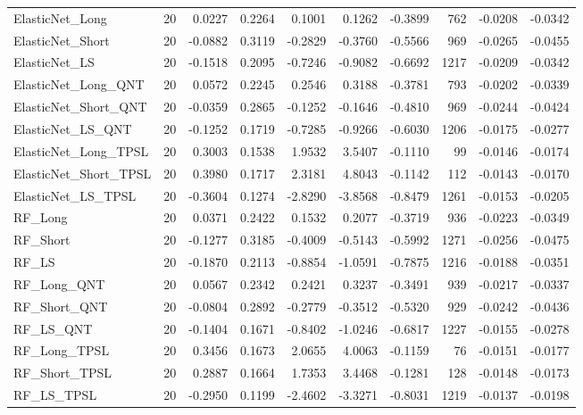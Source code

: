 \begin{tabular}{llrrrrrrrr}
\cline{1-10}
ElasticNet\_Long & 20 & 0.0227 & 0.2264 & 0.1001 & 0.1262 & -0.3899 & 762 & -0.0208 & -0.0342 \\
\cline{1-10}
ElasticNet\_Short & 20 & -0.0882 & 0.3119 & -0.2829 & -0.3760 & -0.5566 & 969 & -0.0265 & -0.0455 \\
\cline{1-10}
ElasticNet\_LS & 20 & -0.1518 & 0.2095 & -0.7246 & -0.9082 & -0.6692 & 1217 & -0.0209 & -0.0342 \\
\cline{1-10}
ElasticNet\_Long\_QNT & 20 & 0.0572 & 0.2245 & 0.2546 & 0.3188 & -0.3781 & 793 & -0.0202 & -0.0339 \\
\cline{1-10}
ElasticNet\_Short\_QNT & 20 & -0.0359 & 0.2865 & -0.1252 & -0.1646 & -0.4810 & 969 & -0.0244 & -0.0424 \\
\cline{1-10}
ElasticNet\_LS\_QNT & 20 & -0.1252 & 0.1719 & -0.7285 & -0.9266 & -0.6030 & 1206 & -0.0175 & -0.0277 \\
\cline{1-10}
ElasticNet\_Long\_TPSL & 20 & 0.3003 & 0.1538 & 1.9532 & 3.5407 & -0.1110 & 99 & -0.0146 & -0.0174 \\
\cline{1-10}
ElasticNet\_Short\_TPSL & 20 & 0.3980 & 0.1717 & 2.3181 & 4.8043 & -0.1142 & 112 & -0.0143 & -0.0170 \\
\cline{1-10}
ElasticNet\_LS\_TPSL & 20 & -0.3604 & 0.1274 & -2.8290 & -3.8568 & -0.8479 & 1261 & -0.0153 & -0.0205 \\
\cline{1-10}
RF\_Long & 20 & 0.0371 & 0.2422 & 0.1532 & 0.2077 & -0.3719 & 936 & -0.0223 & -0.0349 \\
\cline{1-10}
RF\_Short & 20 & -0.1277 & 0.3185 & -0.4009 & -0.5143 & -0.5992 & 1271 & -0.0256 & -0.0475 \\
\cline{1-10}
RF\_LS & 20 & -0.1870 & 0.2113 & -0.8854 & -1.0591 & -0.7875 & 1216 & -0.0188 & -0.0351 \\
\cline{1-10}
RF\_Long\_QNT & 20 & 0.0567 & 0.2342 & 0.2421 & 0.3237 & -0.3491 & 939 & -0.0217 & -0.0337 \\
\cline{1-10}
RF\_Short\_QNT & 20 & -0.0804 & 0.2892 & -0.2779 & -0.3512 & -0.5320 & 929 & -0.0242 & -0.0436 \\
\cline{1-10}
RF\_LS\_QNT & 20 & -0.1404 & 0.1671 & -0.8402 & -1.0246 & -0.6817 & 1227 & -0.0155 & -0.0278 \\
\cline{1-10}
RF\_Long\_TPSL & 20 & 0.3456 & 0.1673 & 2.0655 & 4.0063 & -0.1159 & 76 & -0.0151 & -0.0177 \\
\cline{1-10}
RF\_Short\_TPSL & 20 & 0.2887 & 0.1664 & 1.7353 & 3.4468 & -0.1281 & 128 & -0.0148 & -0.0173 \\
\cline{1-10}
RF\_LS\_TPSL & 20 & -0.2950 & 0.1199 & -2.4602 & -3.3271 & -0.8031 & 1219 & -0.0137 & -0.0198 \\

\end{tabular}
